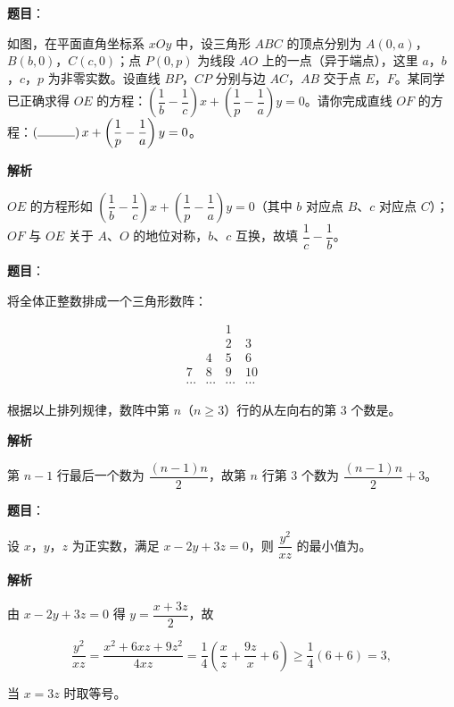 \begin{answer}

\textbf{题目}：

如图，在平面直角坐标系 $xOy$ 中，设三角形 $ABC$ 的顶点分别为 $A(0,a)$，$B(b,0)$，$C(c,0)$；点 $P(0,p)$ 为线段 $AO$ 上的一点（异于端点），这里 $a$，$b$，$c$，$p$ 为非零实数。设直线 $BP$，$CP$ 分别与边 $AC$，$AB$ 交于点 $E$，$F$。某同学已正确求得 $OE$ 的方程：$\left(\dfrac1b-\dfrac1c\right)x+\left(\dfrac1p-\dfrac1a\right)y=0$。请你完成直线 $OF$ 的方程：$\left(\rule{3em}{0.4pt}\right)x+\left(\dfrac1p-\dfrac1a\right)y=0$。

\textbf{解析}

$OE$ 的方程形如 $\left(\dfrac1b-\dfrac1c\right)x+\left(\dfrac1p-\dfrac1a\right)y=0$（其中 $b$ 对应点 $B$、$c$ 对应点 $C$）；$OF$ 与 $OE$ 关于 $A$、$O$ 的地位对称，$b$、$c$ 互换，故填 $\dfrac1c-\dfrac1b$。


\end{answer}
\begin{answer}

\textbf{题目}：

将全体正整数排成一个三角形数阵：

\nopagebreak[4]
\[\begin{array}{cccccc}&&1&&&\\&&2&3&&\\&4&5&6&&\\7&8&9&10&&\\\cdots&\cdots&\cdots&\cdots&&\end{array}\]

根据以上排列规律，数阵中第 $n$（$n\geqslant3$）行的从左向右的第 $3$ 个数是\gkblank{}。

\textbf{解析}

第 $n-1$ 行最后一个数为 $\dfrac{(n-1)n}2$，故第 $n$ 行第 $3$ 个数为 $\dfrac{(n-1)n}2+3$。


\end{answer}
\begin{answer}

\textbf{题目}：

设 $x$，$y$，$z$ 为正实数，满足 $x-2y+3z=0$，则 $\dfrac{y^2}{xz}$ 的最小值为\gkblank{}。

\textbf{解析}

由 $x-2y+3z=0$ 得 $y=\dfrac{x+3z}2$，故

\nopagebreak[4]
\[\frac{y^2}{xz}=\frac{x^2+6xz+9z^2}{4xz}=\frac14\left(\frac xz+\frac{9z}x+6\right)\geqslant\frac14(6+6)=3,\]

当 $x=3z$ 时取等号。


\end{answer}

